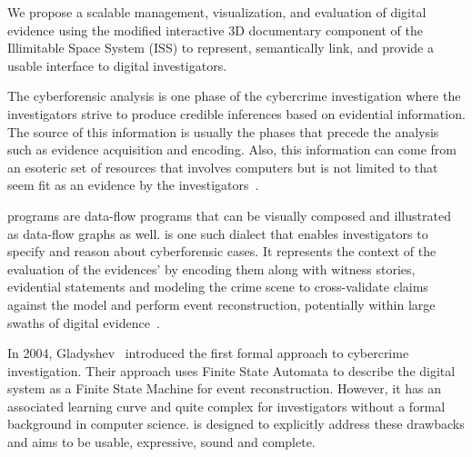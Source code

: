 We propose a scalable management, visualization, and evaluation of digital evidence using the 
modified interactive 3D documentary component of the Illimitable Space System (ISS) to represent,
semantically link, and provide a usable interface to digital investigators.
%
%

The cyberforensic analysis is one phase of the cybercrime investigation
where the investigators strive to produce credible inferences based on evidential
information. The source of this information is usually the phases that
precede the analysis such as evidence acquisition and encoding. Also, this
information can come from an esoteric set of resources that involves computers
but is not limited to that seem fit as an evidence by the
investigators~\cite{mokhov-phd-thesis-2013,flucid-dfg-viz-pst2011}.

{\lucid} programs are data-flow programs that can be visually composed
and illustrated as data-flow graphs as well. {\flucid} is one such {\lucid}
dialect that enables investigators to specify and reason about cyberforensic
cases. It represents the context of the evaluation of the evidences' by encoding
them along with witness stories, evidential statements and modeling the crime scene
to cross-validate claims against the model and perform event reconstruction,
potentially within large swaths of digital evidence~\cite{mokhov-phd-thesis-2013,flucid-dfg-viz-pst2011}.


In 2004, Gladyshev~\cite{gladyshev-phd-2004} introduced the first formal approach to cybercrime investigation.
Their approach uses Finite State Automata to describe the digital system as a Finite State Machine
for event reconstruction. However, it has an associated learning curve and quite complex
for investigators without a formal background in computer science.
{\flucid} is designed to explicitly address these drawbacks and aims to be usable,
expressive, sound and complete. 

